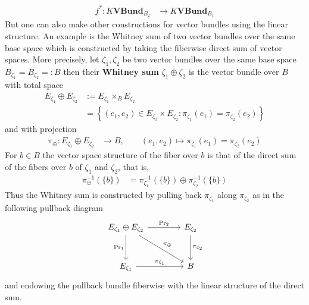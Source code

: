 \begin{align*}
  f^{\ast}
  \colon
  K\mathbf{VBund}_{B_{2}}
  &\to
  K\mathbf{VBund}_{B_{1}}
\end{align*}
But one can also make other constructions for vector bundles using the linear structure. An example is the Whitney sum of two vector bundles over the same base space which is constructed by taking the fiberwise direct sum of vector spaces. More precisely, let $\zeta_{1},\zeta_{2}$ be two vector bundles over the same base space $B_{\zeta_{1}} = B_{\zeta_{2}} =: B$ then their \textbf{Whitney sum} $\zeta_{1} \oplus \zeta_{2}$ is the vector bundle over $B$ with total space
\begin{align*}
  E_{\zeta_{1}}
  \oplus
  E_{\zeta_{2}}
  &:=
  E_{\zeta_{1}}
  \times_{B}
  E_{\zeta_{2}}
  \\
  &=
  \left\lbrace
    (e_{1},e_{2})
    \in
    E_{\zeta_{1}}
    \times
    E_{\zeta_{2}}
    \colon
    \pi_{\zeta_{1}}(e_{1})
    =
    \pi_{\zeta_{2}}(e_{2})
  \right\rbrace
\end{align*}
and with projection
\begin{align*}
  \pi_{\oplus}
  \colon
  E_{\zeta_{1}}
  \oplus
  E_{\zeta_{2}}
  &\to
  B
  ,\qquad
  (e_{1},e_{2})
  \mapsto
  \pi_{\zeta_{1}}(e_{1})
  =
  \pi_{\zeta_{2}}(e_{2})
\end{align*}
For $b \in B$ the vector space structure of the fiber over $b$ is that of the direct sum of the fibers over $b$ of $\zeta_{1}$ and $\zeta_{2}$, that is,
\begin{align*}
  \pi_{\oplus}^{-1}
  \left(
    \lbrace b \rbrace
  \right)
  &=
  \pi_{\zeta_{1}}^{-1}
  \left(
    \lbrace b \rbrace
  \right)
  \oplus
  \pi_{\zeta_{2}}^{-1}
  \left(
    \lbrace b \rbrace
  \right)
\end{align*}
Thus the Whitney sum is constructed by pulling back $\pi_{\zeta_{1}}$ along $\pi_{\zeta_{2}}$ as in the following pullback diagram
\begin{equation*}
\begin{tikzcd}[row sep=3em,column sep=4em]
  E_{\zeta_{1}} \oplus E_{\zeta_{2}}
  \ar{r}{\mathrm{Pr}_{2}}
  \ar{rd}{\pi_{\oplus}}
  \ar{d}[swap]{\mathrm{Pr}_{1}}
  &
  E_{\zeta_{2}}
  \ar{d}{\pi_{\zeta_{2}}}
  \\
  E_{\zeta_{1}}
  \ar{r}{\pi_{\zeta_{1}}}
  &
  B
\end{tikzcd}
\end{equation*}
and endowing the pullback bundle fiberwise with the linear structure of the direct sum.
\\
